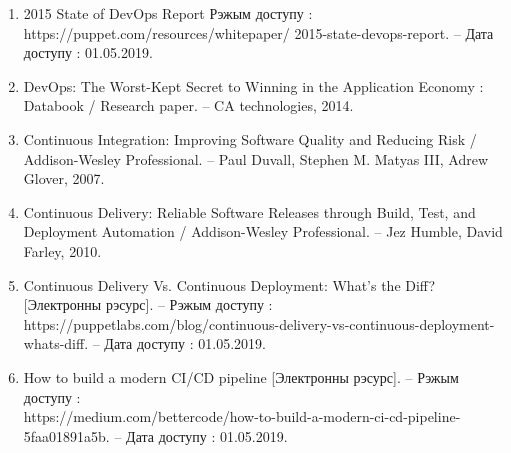\begin{enumerate}[{label=\arabic{*}}]
    \item 2015 State of DevOps Report
          Рэжым доступу : https://puppet.com/resources/whitepaper/
          2015-state-devops-report. --
          Дата доступу : 01.05.2019.
        \label{site:puppet.com/resources/whitepaper/2015}

    \item DevOps: The Worst-Kept Secret to Winning
          in the Application Economy : Databook /
          Research paper. --
          CA technologies, 2014.
        \label{article:DevOps:The Worst-Kept Secret}

    \item Continuous Integration:
          Improving Software Quality and Reducing Risk /
          Addison-Wesley Professional. --
          Paul Duvall, Stephen M. Matyas III, Adrew Glover, 2007.
        \label{book:Continuous Integration}

    \item Continuous Delivery: 
          Reliable Software Releases through Build, Test, 
          and Deployment Auto\-mation / 
          Addison-Wesley Professional. -- 
          Jez Humble, David Farley, 2010.
        \label{book:Continuous Delivery}

    \item Continuous Delivery Vs. Continuous Deployment: What's the Diff?
          [Электронны рэсурс].\,\,--
          Рэжым доступу : https://puppetlabs.com/blog/continuous-delivery-vs-continuous-deployment-whats-diff. --
          Дата доступу : 01.05.2019.
        \label{book:Continuous Delivery vs. Continuous Deployment}

    \item How to build a modern CI/CD pipeline
          [Электронны рэсурс]. --
          Рэжым доступу : \\
          https://medium.com/bettercode/how-to-build-a-modern-ci-cd-pipeline-5faa01891a5b. --
          Дата доступу : 01.05.2019.
        \label{site:CI/CD-pipeline}
\end{enumerate}
